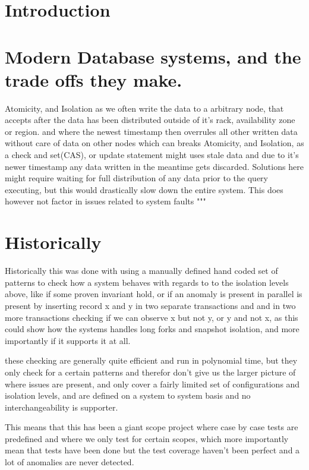 \documentclass[a4paper,10pt,titlepage]{report}
\begin{document}
\section{Introduction}


\section{Modern Database systems, and the trade offs they make.}


Atomicity, and Isolation as we often write the data to a arbitrary node, that accepts after the data has been distributed outside of it's rack, availability zone or region. and where the newest timestamp then overrules all other written data without care of data on other nodes which can breaks Atomicity, and Isolation, as a check and set(CAS), or update statement might uses stale data and due to it's newer timestamp any data written in the meantime gets discarded. Solutions here might require waiting for full distribution of any data prior to the query executing, but this would drastically slow down the entire system. This does however not factor in issues related to system faults
"""

\section{Historically}

Historically this was done with using a manually defined hand coded set of patterns to check how a system behaves with regards to to the isolation levels above, like if some proven invariant hold, or if an anomaly is present in parallel is present by inserting record x and y in two separate transactions and and in two more transactions checking if we can observe x but not y, or y and not x, as this could show how the systems handles long forks and snapshot isolation, and more importantly if it supports it at all.

these checking are generally quite efficient and run in polynomial time, but they only check for a certain patterns and therefor don't give us the larger picture of where issues are present, and only cover a fairly limited set of configurations and isolation levels, and are defined on a system to system basis and no interchangeability is supporter.

This means that this has been a giant scope project where case by case tests are predefined and where we only test for certain scopes, which more importantly mean that tests have been done but the test coverage haven't been perfect and a lot of anomalies are never detected.
\end{document}
